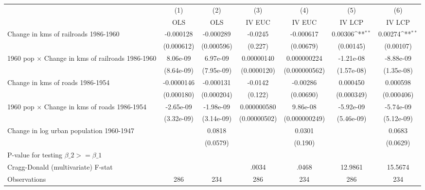 {
\def\sym#1{\ifmmode^{#1}\else\(^{#1}\)\fi}
\begin{tabular}{l*{6}{c}}
\hline\hline
                &\multicolumn{1}{c}{(1)}&\multicolumn{1}{c}{(2)}&\multicolumn{1}{c}{(3)}&\multicolumn{1}{c}{(4)}&\multicolumn{1}{c}{(5)}&\multicolumn{1}{c}{(6)}\\
                &\multicolumn{1}{c}{OLS}&\multicolumn{1}{c}{OLS}&\multicolumn{1}{c}{IV EUC}&\multicolumn{1}{c}{IV EUC}&\multicolumn{1}{c}{IV LCP}&\multicolumn{1}{c}{IV LCP}\\
\hline
Change in kms of railroads 1986-1960&-0.000128         &-0.000289         &  -0.0245         &-0.000617         &  0.00306\sym{**} &  0.00274\sym{**} \\
                &(0.000612)         &(0.000596)         &  (0.227)         &(0.00679)         &(0.00145)         &(0.00107)         \\
[1em]
1960 pop $\times$ Change in kms of railroads 1986-1960& 8.06e-09         & 6.97e-09         &0.00000140         &0.000000224         &-1.21e-08         &-8.88e-09         \\
                &(8.64e-09)         &(7.95e-09)         &(0.0000120)         &(0.000000562)         &(1.57e-08)         &(1.35e-08)         \\
[1em]
Change in kms of roads 1986-1954&-0.0000146         &-0.000131         &  -0.0142         & -0.00286         & 0.000450         & 0.000598         \\
                &(0.000180)         &(0.000204)         &  (0.122)         &(0.00690)         &(0.000349)         &(0.000406)         \\
[1em]
1960 pop $\times$ Change in kms of roads 1986-1954&-2.65e-09         &-1.98e-09         &0.000000580         & 9.86e-08         &-5.92e-09         &-5.74e-09         \\
                &(3.32e-09)         &(3.14e-09)         &(0.00000502)         &(0.000000249)         &(5.46e-09)         &(5.12e-09)         \\
[1em]
Change in log urban population 1960-1947&                  &   0.0818         &                  &   0.0301         &                  &   0.0683         \\
                &                  & (0.0579)         &                  &  (0.190)         &                  & (0.0629)         \\
\hline
P-value for testing $\beta\_{2} >= \beta\_{1}$&                  &                  &                  &                  &                  &                  \\
Cragg-Donald (multivariate) F-stat&                  &                  &    .0034         &    .0468         &  12.9861         &  15.5674         \\
Observations    &      286         &      234         &      286         &      234         &      286         &      234         \\
\hline\hline
\end{tabular}
}
